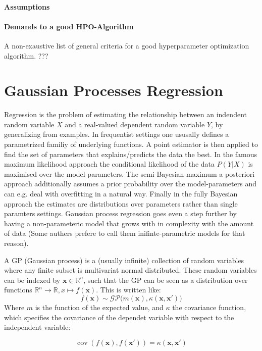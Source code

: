 \documentclass[english]{article}
\begin{document}
\paragraph{Assumptions}


\paragraph{Demands to a good HPO-Algorithm}
A non-exaustive list of general criteria for a good hyperparameter optimization algorithm. ???


\section{Gaussian Processes Regression}
Regression is the problem of estimating the relationship between an indendent random variable $X$ and a real-valued dependent random variable $Y$, by generalizing from examples. In frequentist settings one ususally defines a parametrized familiy of underlying functions. A point estimator is then applied to find the set of parameters that explains/predicts the data the best. In the famous maximum likelihood approach the conditional likelihood of the data $P(Y|X)$ is maximised over the model parameters. The semi-Bayesian maximum a posteriori approach additionally assumes a prior probability over the model-parameters and can e.g. deal with overfitting in a natural way. Finally in the fully Bayesian approach the estimates are distributions over parameters rather than single paramters settings. Gaussian process regression goes even a step further by having a non-parameteric model that grows with in complexity with the amount of data (Some authers prefere to call them inifinte-parametric models for that reason).

A GP (Gaussian process) is a (usually infinite) collection of random variables where any finite subset is multivariat normal distributed. These random variables can be indexed by $\mathbf{x} \in \mathbb{R}^n$, such that the GP can be seen as a distribution over functions $\mathbb{R}^n \rightarrow \mathbb{R}, x \mapsto f(\mathbf{x})$. This is written like:
$$f(\mathbf{x}) \sim \mathcal{GP}\big(m(\mathbf{x}), \kappa(\mathbf{x},\mathbf{x}')\big)$$
Where $m$ is the function of the expected value, and $\kappa$ the covariance function, which specifies the covariance of the dependet variable with respect to the independent variable:

$$\operatorname{cov}(f(\mathbf{x}),f(\mathbf{x}')) = \kappa(\mathbf{x},\mathbf{x}')$$
\end{document}
